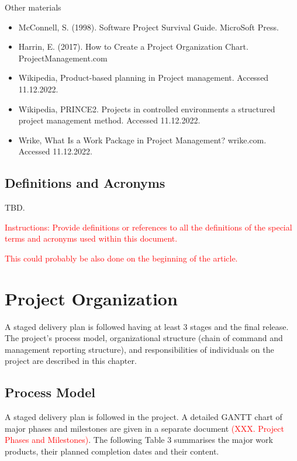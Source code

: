 \documentclass{article}
\begin{document}
Other materials
\begin{itemize}
\item McConnell, S. (1998). Software Project Survival Guide. MicroSoft Press.
\item Harrin, E. (2017). How to Create a Project Organization Chart. ProjectManagement.com
\item Wikipedia, Product-based planning in Project management. Accessed 11.12.2022.
\item Wikipedia, PRINCE2. Projects in controlled environments a structured project management method. Accessed 11.12.2022.
\item Wrike, What Is a Work Package in Project Management? wrike.com. Accessed 11.12.2022.
\end{itemize}

\subsection{Definitions and Acronyms}

TBD.

\textcolor{red}{Instructions: Provide definitions or references to all the definitions of the special terms and acronyms used within this document.}

\textcolor{red}{This could probably be also done on the beginning of the article.}

\section{Project Organization}
A staged delivery plan is followed having at least 3 stages and the final release.
The project’s process model, organizational structure (chain of command and
management reporting structure), and responsibilities of individuals on the project
are described in this chapter.



\subsection{Process Model}
A staged delivery plan is followed in the project. A detailed GANTT chart of major
phases and milestones are given in a separate document \textcolor{red}{(XXX. Project Phases
and Milestones)}. The following Table 3 summarises the major work products,
their planned completion dates and their content.
\end{document}
